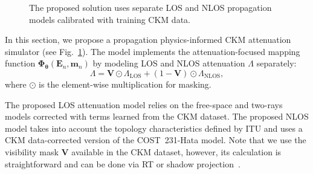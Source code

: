 \documentclass[10pt,conference,letterpaper]{IEEEtran}
\begin{document}
\begin{figure}[t]
\centering
{}
\caption{The proposed solution uses separate LOS and NLOS propagation models calibrated with training CKM data.}
\label{fig:CKM_model}
\end{figure}

In this section, we propose a propagation physics-informed CKM attenuation simulator (see Fig.~\ref{fig:CKM_model}). The model implements the attenuation-focused mapping function $\mathbf{\Phi}_{\boldsymbol{\theta}}(\mathbf{E}_n, \mathbf{m}_n)$ by modeling LOS and NLOS attenuation $\Lambda$ separately:
\begin{equation}
\Lambda=\mathbf{V} \odot \Lambda_\text{LOS} + (1-\mathbf{V}) \odot \Lambda_\text{NLOS},
\label{eq:combined}
\end{equation}
where $\odot$ is the element-wise multiplication for masking. 

The proposed LOS attenuation model relies on the free-space and two-rays models corrected with terms learned from the CKM dataset. The proposed NLOS model takes into account the topology characteristics defined by ITU and uses a CKM data-corrected version of the COST~231-Hata model. Note that we use the visibility mask $\mathbf{V}$ available in the CKM dataset, however, its calculation is straightforward and can be done via RT or shadow projection~\cite{vinogradov2026shadow,vinogradov2026upsim}.
\end{document}
